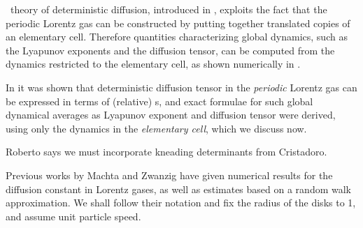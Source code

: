 

\Po\ theory of deterministic diffusion, introduced in
, exploits the fact that the periodic
Lorentz gas can be constructed by putting together translated copies
of an elementary cell.  Therefore quantities characterizing global
dynamics, such as the Lyapunov exponents and the diffusion tensor, can
be computed from the dynamics restricted to the elementary cell, as
shown numerically in .

In  it was shown
that deterministic diffusion tensor in the {\em periodic} Lorentz gas
can be expressed in terms of (relative) \po s, and exact formulae for
such global dynamical averages as Lyapunov exponent and diffusion
tensor were derived, using only the dynamics in the \emph{elementary
cell}, which we discuss now.

     { Roberto says we must incorporate kneading
    determinants from Cristadoro.
    }



Previous works by Machta and Zwanzig have given numerical
results for the diffusion constant in Lorentz gases,  as well as
estimates based on a random walk approximation. We shall follow their
notation and fix the radius of the disks to 1, and assume unit
particle speed.

